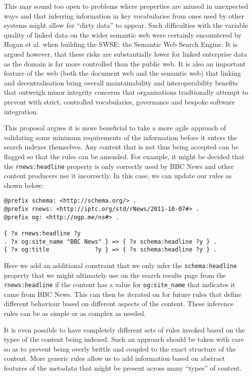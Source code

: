 This may sound too open to problems where properties are miused in
unexpected ways and that inferring information in key vocabularies from
ones used by other systems might allow for ``dirty data'' to appear. Such
difficulties with the variable quality of linked data on the wider semantic
web were certainly encountered by Hogan et al.\cite{hogan2011searching} when
building the SWSE: the Semantic Web Search Engine. It is argued however,
that these risks are substantially lower for linked enterprise data as
the domain is far more controlled than the public web. It is also an important
feature of the web (both the document web and the semantic web) that linking and
decentralisation bring overall maintainability and interoperability benefits
that outweigh minor integrity concerns that organisations tradtionally attempt
to prevent with strict, controlled vocabularies, governance and bespoke
software integration.

This proposal argues it is more beneficial to take a more agile approach
of validating some minimum requirements of the information before it
enters the search indexes themselves. Any content that is not thus
being accepted can be flagged so that the rules can be amended. For example,
it might be decided that the \texttt{rnews:headline} property is only
correctly used by BBC News and other content producers use it incorrectly. In
this case, we can update our rules as shown below:

\begin{centering}
\begin{lstlisting}[language=ttl]
@prefix schema: <http://schema.org/> .
@prefix rnews: <http://iptc.org/std/rNews/2011-10-07#> .
@prefix og: <http://ogp.me/ns#> .

{ ?x rnews:headline ?y
. ?x og:site_name "BBC News" } => { ?x schema:headline ?y } .
{ ?x og:title             ?y } => { ?x schema:headline ?y } .
\end{lstlisting}
\end{centering}

Here we add an additional constraint
that we only infer the \texttt{schema:headline} property that we might
ultimately use on the search results page from the \texttt{rnews:headline} if
the content has a value for \texttt{og:site\_name} that indicates it came
from BBC News. This can then be iterated on for future rules that define
different behaviour based on different aspects of the content. These inference
rules can be as simple or as complex as needed.

It is even possible to have
completely different sets of rules invoked based on the types of the content
being indexed. Such an approach should be taken with care so as to prevent
being overly brittle and coupled to the exact structure of the content. More
generic rules allow us to add information based on abstract features of the
metadata that might be present across many ``types'' of content.

